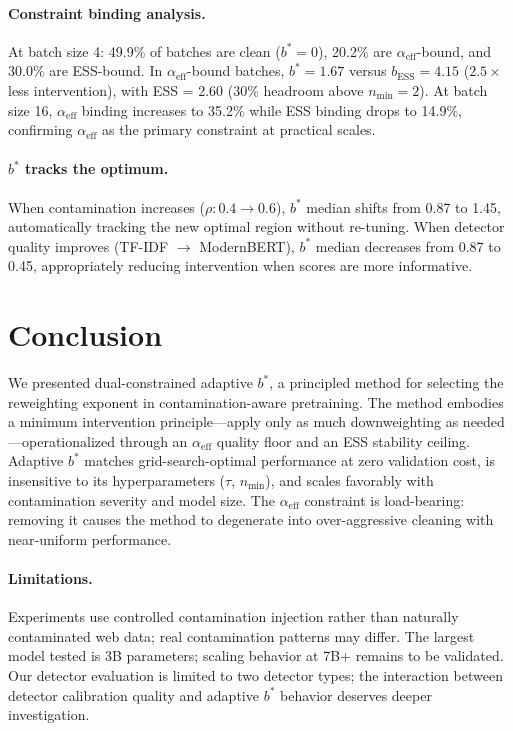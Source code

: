 \documentclass[11pt,a4paper]{article}
\newcommand{\bstar}{b^{*}}
\newcommand{\aeff}{\alpha_{\mathrm{eff}}}
\newcommand{\nmin}{n_{\min}}
\newcommand{\bESS}{b_{\mathrm{ESS}}}
\begin{document}
\paragraph{Constraint binding analysis.}
At batch size 4: 49.9\% of batches are clean ($\bstar = 0$), 20.2\% are $\aeff$-bound, and 30.0\% are ESS-bound.
In $\aeff$-bound batches, $\bstar = 1.67$ versus $\bESS = 4.15$ ($2.5\times$ less intervention), with ESS = 2.60 (30\% headroom above $\nmin = 2$).
At batch size 16, $\aeff$ binding increases to 35.2\% while ESS binding drops to 14.9\%, confirming $\aeff$ as the primary constraint at practical scales.

\paragraph{$\bstar$ tracks the optimum.}
When contamination increases ($\rho: 0.4 \to 0.6$), $\bstar$ median shifts from 0.87 to 1.45, automatically tracking the new optimal region without re-tuning.
When detector quality improves (TF-IDF $\to$ ModernBERT), $\bstar$ median decreases from 0.87 to 0.45, appropriately reducing intervention when scores are more informative.


\section{Conclusion}
\label{sec:conclusion}

We presented dual-constrained adaptive $\bstar$, a principled method for selecting the reweighting exponent in contamination-aware pretraining.
The method embodies a minimum intervention principle---apply only as much downweighting as needed---operationalized through an $\aeff$ quality floor and an ESS stability ceiling.
Adaptive $\bstar$ matches grid-search-optimal performance at zero validation cost, is insensitive to its hyperparameters ($\tau$, $\nmin$), and scales favorably with contamination severity and model size.
The $\aeff$ constraint is load-bearing: removing it causes the method to degenerate into over-aggressive cleaning with near-uniform performance.

\paragraph{Limitations.}
Experiments use controlled contamination injection rather than naturally contaminated web data; real contamination patterns may differ.
The largest model tested is 3B parameters; scaling behavior at 7B+ remains to be validated.
Our detector evaluation is limited to two detector types; the interaction between detector calibration quality and adaptive $\bstar$ behavior deserves deeper investigation.


\end{document}
